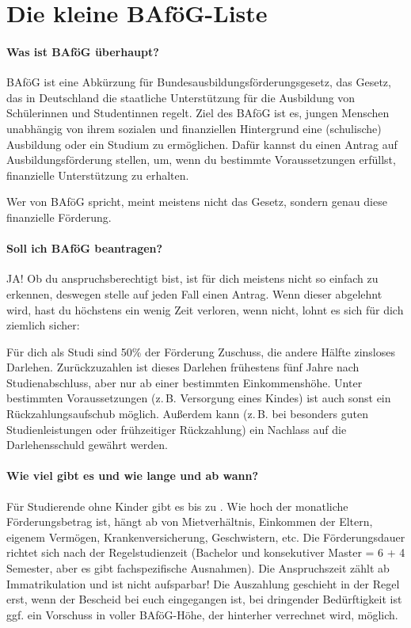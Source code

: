 
\section{Die kleine BAföG-Liste}

\paragraph{Was ist BAföG überhaupt?}
BAföG ist eine Abkürzung für \glqq{}Bundesausbildungsförderungsgesetz\grqq{}, das Gesetz, das in Deutschland die staatliche Unterstützung für die Ausbildung von Schülerinnen und Studentinnen regelt. Ziel des BAföG ist es, jungen Menschen unabhängig von ihrem sozialen und finanziellen Hintergrund eine (schulische) Ausbildung oder ein Studium zu ermöglichen. Dafür kannst du einen \glqq{}Antrag auf Ausbildungsförderung\grqq{} stellen, um, wenn du bestimmte Voraussetzungen erfüllst, finanzielle Unterstützung zu erhalten. 

Wer von BAföG spricht, meint meistens nicht das Gesetz, sondern genau diese finanzielle Förderung.

\paragraph{Soll ich BAföG beantragen?}
JA! Ob du anspruchsberechtigt bist, ist für dich meistens nicht so einfach zu erkennen, deswegen stelle auf jeden Fall einen Antrag. Wenn dieser abgelehnt wird, hast du höchstens ein wenig Zeit verloren, wenn nicht, lohnt es sich für dich ziemlich sicher:

Für dich als Studi sind 50\% der Förderung Zuschuss, die andere Hälfte zinsloses Darlehen. Zurückzuzahlen ist dieses Darlehen frühestens fünf Jahre nach Studienabschluss, aber nur ab einer bestimmten Einkommenshöhe. Unter bestimmten Voraussetzungen (z.\,B. Versorgung eines Kindes) ist auch sonst ein Rückzahlungsaufschub möglich. Außerdem kann (z.\,B. bei besonders guten Studienleistungen oder frühzeitiger Rückzahlung) ein Nachlass auf die Darlehensschuld gewährt werden.

\paragraph{Wie viel gibt es und wie lange und ab wann?}
Für Studierende ohne Kinder gibt es bis zu \bafoeghoechstsatz. Wie hoch der monatliche Förderungsbetrag ist, hängt ab von Mietverhältnis, Einkommen der Eltern, eigenem Vermögen, Krankenversicherung, Geschwistern, etc. Die Förderungsdauer richtet sich nach der Regelstudienzeit (Bachelor und konsekutiver Master = 6 + 4 Semester, aber es gibt fachspezifische Ausnahmen). Die Anspruchszeit zählt ab Immatrikulation und ist nicht aufsparbar! Die Auszahlung geschieht in der Regel erst, wenn der Bescheid bei euch eingegangen ist, bei dringender Bedürftigkeit ist ggf. ein Vorschuss in voller BAföG-Höhe, der hinterher verrechnet wird, möglich.


